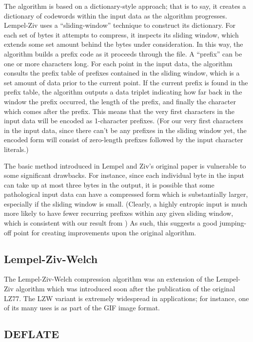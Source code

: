 \documentclass[12pt]{article}
\begin{document}
The algorithm is based on a dictionary-style approach; that is to say,
it creates a dictionary of codewords within the input data as the
algorithm progresses. Lempel-Ziv uses a ``sliding-window'' technique
to construct its dictionary. For each set of bytes it attempts to
compress, it inspects its sliding window, which extends some set
amount behind the bytes under consideration. In this way, the
algorithm builds a prefix code as it proceeds through the file. A
``prefix'' can be one or more characters long. For each point in the
input data, the algorithm consults the prefix table of prefixes
contained in the sliding window, which is a set amount of data prior
to the current point. If the current prefix is found in the prefix
table, the algorithm outputs a data triplet indicating how far back in
the window the prefix occurred, the length of the prefix, and finally
the character which comes after the prefix. This means that the very
first characters in the input data will be encoded as 1-character
prefixes. (For our very first characters in the input data, since
there can't be any prefixes in the sliding window yet, the encoded
form will consist of zero-length prefixes followed by the input
character literals.)

The basic method introduced in Lempel and Ziv's original paper is
vulnerable to some significant drawbacks. For instance, since each
individual byte in the input can take up at most three bytes in the
output, it is possible that some pathological input data can have a
compressed form which is substantially larger, especially if the
sliding window is small. (Clearly, a highly entropic input is much
more likely to have fewer recurring prefixes within any given sliding
window, which is consistent with our result from
) As such, this suggests a good jumping-off
point for creating improvements upon the original algorithm.

\subsection{Lempel-Ziv-Welch}

The Lempel-Ziv-Welch compression algorithm was an extension of the
Lempel-Ziv algorithm which was introduced soon after the publication
of the original LZ77. \cite{LempelZivWelch} The LZW variant is
extremely widespread in applications; for instance, one of its many
uses is as part of the GIF image format.

\subsection{DEFLATE}
\end{document}
